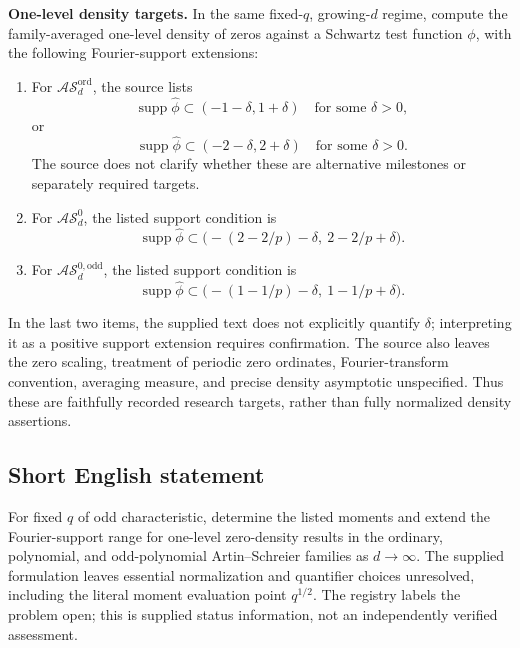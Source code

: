 \documentclass[11pt]{article}
\begin{document}
\textbf{One-level density targets.} In the same fixed-\(q\), growing-\(d\) regime, compute the family-averaged one-level density of zeros against a Schwartz test function \(\phi\), with the following Fourier-support extensions:
\begin{enumerate}
\item For \(\mathcal{AS}^{\mathrm{ord}}_d\), the source lists
\[
\operatorname{supp}\widehat\phi\subset(-1-\delta,1+\delta)
\quad\text{for some }\delta>0,
\]
or
\[
\operatorname{supp}\widehat\phi\subset(-2-\delta,2+\delta)
\quad\text{for some }\delta>0.
\]
The source does not clarify whether these are alternative milestones or separately required targets.
\item For \(\mathcal{AS}^{0}_d\), the listed support condition is
\[
\operatorname{supp}\widehat\phi
\subset\bigl(-(2-2/p)-\delta,\ 2-2/p+\delta\bigr).
\]
\item For \(\mathcal{AS}^{0,\mathrm{odd}}_d\), the listed support condition is
\[
\operatorname{supp}\widehat\phi
\subset\bigl(-(1-1/p)-\delta,\ 1-1/p+\delta\bigr).
\]
\end{enumerate}
In the last two items, the supplied text does not explicitly quantify \(\delta\); interpreting it as a positive support extension requires confirmation. The source also leaves the zero scaling, treatment of periodic zero ordinates, Fourier-transform convention, averaging measure, and precise density asymptotic unspecified. Thus these are faithfully recorded research targets, rather than fully normalized density assertions.
\subsection{Short English statement}
For fixed \(q\) of odd characteristic, determine the listed moments and extend the Fourier-support range for one-level zero-density results in the ordinary, polynomial, and odd-polynomial Artin--Schreier families as \(d\to\infty\). The supplied formulation leaves essential normalization and quantifier choices unresolved, including the literal moment evaluation point \(q^{1/2}\). The registry labels the problem open; this is supplied status information, not an independently verified assessment.
\end{document}
